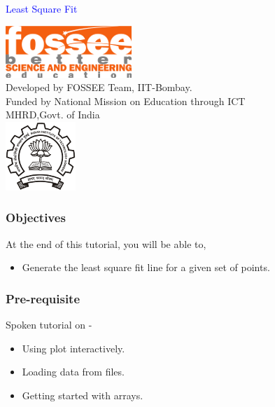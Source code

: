 \documentclass[presentation]{beamer}
\title{}
\author{FOSSEE}
\date{}
\begin{document}
\begin{frame}

\begin{center}
\vspace{12pt}
\textcolor{blue}{\huge Least Square Fit}
\end{center}
\vspace{18pt}
\begin{center}
\vspace{10pt}
\includegraphics[scale=0.95]{../images/fossee-logo.png}\\
\vspace{5pt}
\scriptsize Developed by FOSSEE Team, IIT-Bombay. \\ 
\scriptsize Funded by National Mission on Education through ICT\\
\scriptsize  MHRD,Govt. of India\\
\includegraphics[scale=0.30]{../images/iitb-logo.png}\\
\end{center}
\end{frame}
\begin{frame}
\frametitle{Objectives}
\label{sec-2}

  At the end of this tutorial, you will be able to,


\begin{itemize}
\item Generate the least square fit line for a
   given set of points.
\end{itemize}
\end{frame}
\begin{frame}
\frametitle{Pre-requisite}
\label{sec-3}

  Spoken tutorial on -

\begin{itemize}
\item Using plot interactively.
\item Loading data from files.
\item Getting started with arrays.
\end{itemize}
\end{frame}
\end{document}
